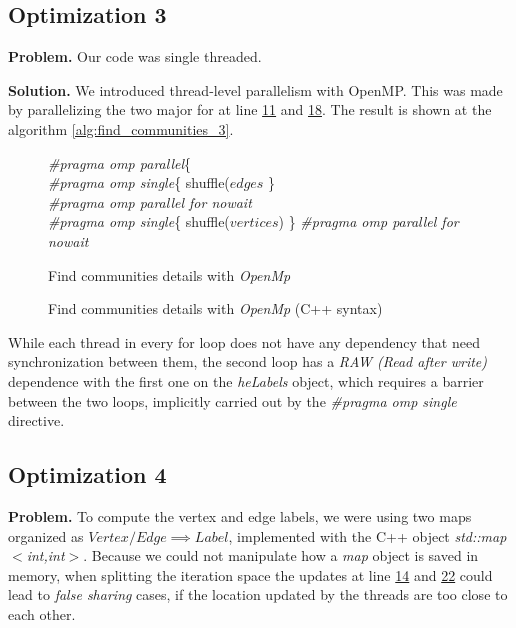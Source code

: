 \documentclass[conference]{IEEEtran}
\newcommand{\mypar}[1]{{\bf #1.}}
\begin{document}
\subsection{Optimization 3}
\mypar{Problem}
Our code was single threaded.

\mypar{Solution}
We introduced thread-level parallelism with OpenMP.  
This was made by parallelizing the two major for at line \hyperref[alg:find_communities]{11} and \hyperref[alg:find_communities]{18}. The result is shown at the algorithm \ref{alg:find_communities_3}.

\begin{figure}[h]
    \centering
    \begin{algorithm}[H]
    \label{alg:find_communities_3}
    \SetAlgoLined
    \LinesNumbered
        \textit{\#pragma omp parallel}\{\\
        \textit{\#pragma omp single}\{ shuffle($edges$ \}\\
        \textit{\#pragma omp parallel for nowait}\\
        \textit{\#pragma omp single}\{ shuffle($vertices$) \}\;
        \textit{\#pragma omp parallel for nowait}\\
    \caption{Find communities details with \textit{OpenMp}}
\end{algorithm}
    \caption{Find communities details with \textit{OpenMp} (C++ syntax)}
    \label{fig:my_label}
\end{figure}

While each thread in every for loop does not have any dependency that need synchronization between them, the second loop has a \textit{RAW (Read after write)} dependence with the first one on the \textit{heLabels} object, which requires a barrier between the two loops, implicitly carried out by the \textit{\#pragma omp single} directive. 

\subsection{Optimization 4}
\mypar{Problem}
To compute the vertex and edge labels, we were using two maps organized as \textit{$Vertex/Edge \implies Label$}, implemented with the C++ object \textit{std::map$<$int,int$>$}. Because we could not manipulate how a \textit{map} object is saved in memory, when splitting the iteration space the updates at line \hyperref[alg:find_communities]{14} and \hyperref[alg:find_communities]{22} could lead to \textit{false sharing} cases, if the location updated by the threads are too close to each other.
\end{document}
